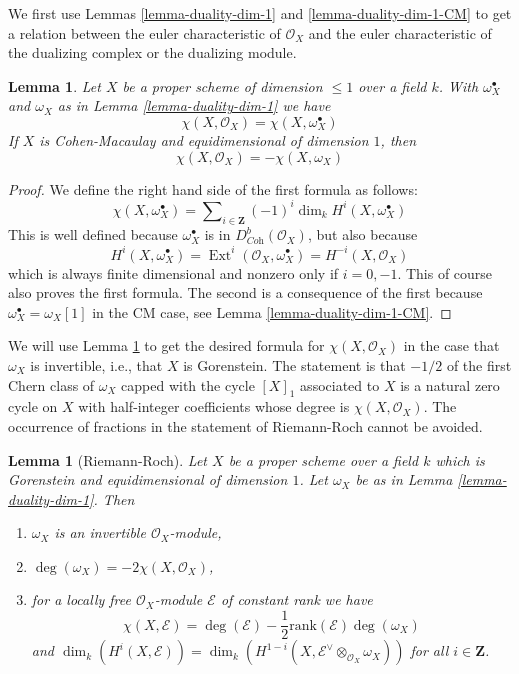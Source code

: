 \documentclass{stacks-project}
\theoremstyle{plain}
\newtheorem{lemma}[subsection]{Lemma}
\theoremstyle{definition}
\theoremstyle{remark}
\numberwithin{equation}{subsection}
\def\Ext{\mathop{\mathrm{Ext}}\nolimits}
\begin{document}
\medskip\noindent
We first use Lemmas \ref{lemma-duality-dim-1} and \ref{lemma-duality-dim-1-CM}
to get a relation between the euler
characteristic of $\mathcal{O}_X$ and the euler characteristic
of the dualizing complex or the dualizing module.

\begin{lemma}
\label{lemma-euler}
Let $X$ be a proper scheme of dimension $\leq 1$ over a field $k$.
With $\omega_X^\bullet$ and $\omega_X$ as in Lemma \ref{lemma-duality-dim-1}
we have
$$
\chi(X, \mathcal{O}_X) = \chi(X, \omega_X^\bullet)
$$
If $X$ is Cohen-Macaulay and equidimensional of dimension $1$, then
$$
\chi(X, \mathcal{O}_X) = - \chi(X, \omega_X)
$$
\end{lemma}

\begin{proof}
We define the right hand side of the first formula as follows:
$$
\chi(X, \omega_X^\bullet) =
\sum\nolimits_{i \in \mathbf{Z}} (-1)^i\dim_k H^i(X, \omega_X^\bullet)
$$
This is well defined because $\omega_X^\bullet$ is in
$D^b_{\textit{Coh}}(\mathcal{O}_X)$, but also because
$$
H^i(X, \omega_X^\bullet) =
\Ext^i(\mathcal{O}_X, \omega_X^\bullet) =
H^{-i}(X, \mathcal{O}_X)
$$
which is always finite dimensional and nonzero only if $i = 0, -1$.
This of course also proves the first formula. The second is a consequence
of the first because $\omega_X^\bullet = \omega_X[1]$ in the CM case, see
Lemma \ref{lemma-duality-dim-1-CM}.
\end{proof}

\noindent
We will use Lemma \ref{lemma-euler} to get the desired formula for
$\chi(X, \mathcal{O}_X)$ in the case that $\omega_X$ is
invertible, i.e., that $X$ is Gorenstein.
The statement is that $-1/2$ of the first Chern class of $\omega_X$
capped with the cycle $[X]_1$ associated to $X$ is a natural zero
cycle on $X$ with half-integer coefficients whose degree is
$\chi(X, \mathcal{O}_X)$.
The occurrence of fractions in the statement of Riemann-Roch cannot
be avoided.

\begin{lemma}[Riemann-Roch]
\label{lemma-rr}
Let $X$ be a proper scheme over a field $k$ which is Gorenstein and
equidimensional of dimension $1$. Let $\omega_X$ be as in
Lemma \ref{lemma-duality-dim-1}. Then
\begin{enumerate}
\item $\omega_X$ is an invertible $\mathcal{O}_X$-module,
\item $\deg(\omega_X) = -2\chi(X, \mathcal{O}_X)$,
\item for a locally free $\mathcal{O}_X$-module $\mathcal{E}$
of constant rank we have
$$
\chi(X, \mathcal{E}) = \deg(\mathcal{E}) -
\textstyle{\frac{1}{2}} \text{rank}(\mathcal{E}) \deg(\omega_X)
$$
and $\dim_k(H^i(X, \mathcal{E})) =
\dim_k(H^{1 - i}(X, \mathcal{E}^\vee \otimes_{\mathcal{O}_X} \omega_X))$
for all $i \in \mathbf{Z}$.
\end{enumerate}
\end{lemma}
\end{document}
